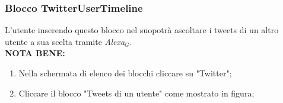 \subsubsection{Blocco TwitterUserTimeline} \label{twitterU}
L'utente inserendo questo blocco nel suopotrà ascoltare i tweets di un altro utente a sua scelta tramite \textit{Alexa$_{G}$}. \\
\textbf{NOTA BENE:} 
\newpage
\begin{enumerate}
	\item Nella schermata di elenco dei blocchi cliccare su "Twitter";
	\item Cliccare il blocco "Tweets di un utente" come mostrato in figura;
	\begin{figure}[!ht]
		\centering

\end{figure}
\end{enumerate}
